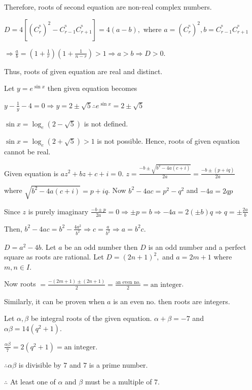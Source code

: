   Therefore, roots of second equation are non-real complex numbers.
\item $D = 4[(C_r^^n)^2 - C_{r - 1}^^nC_{r + 1}^^n] = 4(a - b),$ where $a = (C_r^^n)^2, b = C_{r - 1}^^nC_{r
  + 1}^^n$

  $\Rightarrow \frac{a}{b} = \left(1 + \frac{1}{r}\right)\left(1 + \frac{1}{n - r}\right) > 1\Rightarrow a >
  b \Rightarrow D > 0$.

  Thus, roots of given equation are real and distinct.
\item Let $y = e^{\sin x}$ then given equation becomes

  $y - \frac{1}{y} - 4 = 0\Rightarrow y = 2\pm \sqrt{5} \therefore e^{\sin x} = 2 \pm \sqrt{5}$

  $\sin x = \log_e (2 - \sqrt{5})$ is not defined.

  $\sin x = \log_e (2 + \sqrt{5}) > 1$ is not possible. Hence, roots of given equation cannot be real.
\item Given equation is $az^2 + bz + c + i = 0$. $z = \frac{-b \pm \sqrt{b^2 - 4a(c + i)}}{2a} = \frac{-b
  \pm(p + iq)}{2a}$

  where $\sqrt{b^2 - 4a(c + i)} = p + iq$. Now $b^2 - 4ac = p^2 - q^2$ and $-4a = 2qp$

  Since $z$ is purely imaginary $\frac{-b \pm p}{2a} = 0 \Rightarrow \pm p = b\Rightarrow -4a = 2(\pm b)q
  \Rightarrow q = \pm \frac{2a}{b}$

  Then, $b^2 - 4ac = b^2 - \frac{4a^2}{b^2}\Rightarrow c = \frac{a}{b^2} \Rightarrow a = b^2c$.
\item $D = a^2 - 4b$. Let $a$ be an odd number then $D$ is an odd number and a perfect square as roots
  are rational. Let $D = (2n + 1)^2,$ and $a = 2m + 1$ where $m, n \in I$.

  Now roots $= \frac{-(2m + 1)\pm (2n + 1)}{2} = \frac{\text{an even no.}}{2} = \text{an integer}$.

  Similarly, it can be proven when $a$ is an even no. then roots are integers.
\item Let $\alpha, \beta$ be integral roots of the given equation. $\alpha + \beta = -7$ and $\alpha\beta =
  14(q^2 + 1)$.

  $\frac{\alpha\beta}{7} = 2(q^2 + 1) = \text{an integer}$.

  $\therefore \alpha\beta$ is divisible by $7$ and $7$ is a prime number.

  $\therefore$ At least one of $\alpha$ and $\beta$ must be a multiple of $7$.

